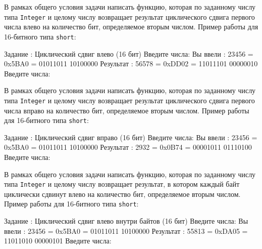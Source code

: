 
\begin{zztask}
В рамках общего условия задачи написать функцию, которая по заданному числу
типа \texttt{Integer} и целому числу возвращает результат циклического
сдвига первого числа влево на количество бит, определяемое вторым числом.
Пример работы для 16-битного типа \texttt{short}:
\begin{zzoutput}
  Задание \thezztask: Циклический сдвиг влево (16 бит)
  Введите числа: 
  Вы ввели  : 23456 = 0x5BA0 = 01011011 10100000
  Результат : 56578 = 0xDD02 = 11011101 00000010
  Введите числа: \zzuser{ }
\end{zzoutput}
\end{zztask}


\begin{zztask}
В рамках общего условия задачи написать функцию, которая по заданному числу
типа \texttt{Integer} и целому числу возвращает результат циклического
сдвига первого числа вправо на количество бит, определяемое вторым числом.
Пример работы для 16-битного типа \texttt{short}:
\begin{zzoutput}
  Задание \thezztask: Циклический сдвиг вправо (16 бит)
  Введите числа: 
  Вы ввели  : 23456 = 0x5BA0 = 01011011 10100000
  Результат :  2932 = 0x0B74 = 00001011 01110100
  Введите числа: \zzuser{ }
\end{zzoutput}
\end{zztask}


\begin{zztask}
В рамках общего условия задачи написать функцию, которая по заданному числу
типа \texttt{Integer} и целому числу возвращает результат, в котором каждый байт
циклически сдвинут влево на количество бит, определяемое вторым числом.
Пример работы для 16-битного типа \texttt{short}:
\begin{zzoutput}
  Задание \thezztask: Циклический сдвиг влево внутри байтов (16 бит)
  Введите числа: 
  Вы ввели  : 23456 = 0x5BA0 = 01011011 10100000
  Результат : 55813 = 0xDA05 = 11011010 00000101
  Введите числа: \zzuser{ }
\end{zzoutput}
\end{zztask}


